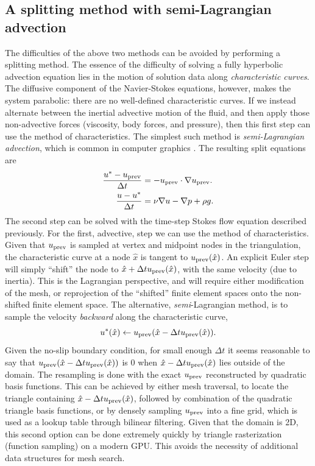 \subsection{A splitting method with semi-Lagrangian advection}
The difficulties of the above two methods can be avoided by performing a splitting method.
The essence of the difficulty of solving a fully hyperbolic advection equation lies in the motion of solution data along \textit{characteristic curves}.
The diffusive component of the Navier-Stokes equations, however, makes the system parabolic: there are no well-defined characteristic curves.
If we instead alternate between 
the inertial advective motion of the fluid,
and then apply those non-advective forces (viscosity, body forces, and pressure),
then this first step can use the method of characteristics. The simplest such method is \textit{semi-Lagrangian advection},
which is common in computer graphics \cite{stam_stable_fluids}.
The resulting split equations are
\begin{equation}
\begin{split}
    \frac{u^* - {u_{\text{prev}}}}{\Delta t} &= -{u_{\text{prev}}}\cdot \nabla{u_{\text{prev}}}. \\
    \frac{u - u^*}{\Delta t} &= \nu \nabla u -\nabla p + \rho g.
\end{split}
\end{equation}
The second step can be solved with the time-step Stokes flow equation described previously. For the first, advective, step
we can use the method of characteristics. Given that ${u_{\text{prev}}}$ is sampled at vertex and midpoint nodes in the triangulation, the characteristic curve
at a node $\hat{x}$ is tangent to ${u_{\text{prev}}}(\hat{x})$. An explicit Euler step will simply ``shift'' the node to $\hat{x} + \Delta t {u_{\text{prev}}}(\hat{x})$,
with the same velocity (due to inertia).
This is the Lagrangian perspective, and will require either modification of the mesh, or reprojection of the ``shifted''
finite element spaces onto the non-shifted finite element space.
The alternative, \textit{semi}-Lagrangian method, is to sample the velocity \textit{backward} along the characteristic curve,
    $$u^*(\hat{x}) \leftarrow {u_{\text{prev}}}(\hat{x} - \Delta t {u_{\text{prev}}}(\hat{x})).$$
Given the no-slip boundary condition, for small enough $\Delta t$ it seems reasonable to say that
${u_{\text{prev}}}(\hat{x} - \Delta t {u_{\text{prev}}}(\hat{x}))$ is $0$ when $\hat{x} - \Delta t {u_{\text{prev}}}(\hat{x})$ lies outside of the domain.
The resampling is done with the exact ${u_{\text{prev}}}$ reconstructed by quadratic basis functions. This can be achieved by either mesh traversal, to locate the triangle
containing $\hat{x} - \Delta t {u_{\text{prev}}}(\hat{x})$, followed by combination of the quadratic triangle basis functions, or by densely sampling ${u_{\text{prev}}}$ into
a fine grid, which is used as a lookup table through bilinear filtering. Given that the domain is 2D, this second option can be done extremely quickly by triangle rasterization (function sampling) on a modern GPU. This avoids the necessity of additional data structures for mesh search.



